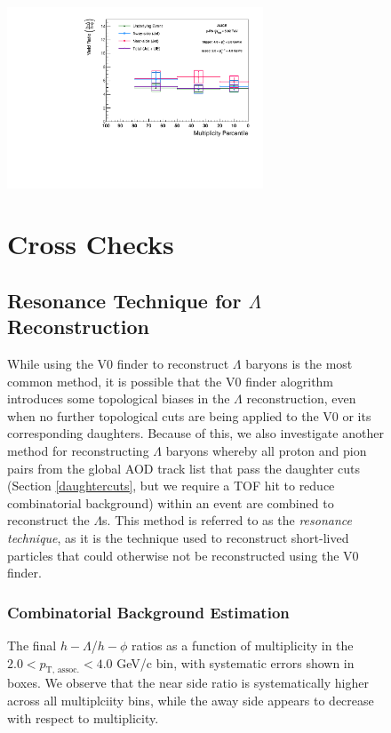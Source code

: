 \documentclass[ALICE,manyauthors]{ALICE_analysis_notes}
\begin{document}
\begin{figure}[ht]
\centering
\includegraphics[width=3in]{figures/lambda_phi_ratio_plot.pdf}
\caption{The final $h-\Lambda$/$h-\phi$ ratios as a function of multiplicity in the $2.0 < p_{\text{T, assoc.}} < 4.0$ GeV/c bin, with systematic errors shown in boxes. We observe that the near side ratio is systematically higher across all multiplciity bins, while the away side appears to decrease with respect to multiplicity.}

\clearpage
\section{Cross Checks}
\subsection{Resonance Technique for $\Lambda$ Reconstruction}
\label{resonance_technique}

While using the V0 finder to reconstruct $\Lambda$ baryons is the most common method, it is possible that the V0 finder alogrithm introduces some topological biases in the $\Lambda$ reconstruction, even when no further topological cuts are being applied to the V0 or its corresponding daughters. Because of this, we also investigate another method for reconstructing $\Lambda$ baryons whereby all proton and pion pairs from the global AOD track list that pass the daughter cuts (Section \ref{daughtercuts}, but we require a TOF hit to reduce combinatorial background) within an event are combined to reconstruct the $\Lambda$s. This method is referred to as the \textit{resonance technique}, as it is the technique used to reconstruct short-lived particles that could otherwise not be reconstructed using the V0 finder.

\subsubsection{Combinatorial Background Estimation}
\label{combinatorial_background}


\end{figure}
\end{document}
